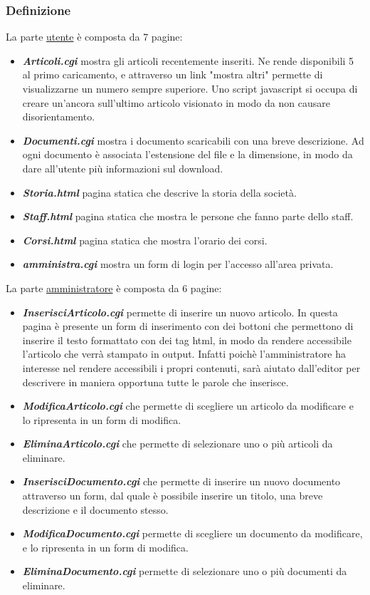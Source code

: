 \subsubsection{Definizione}
	\noindent La parte \underline{utente} \`e composta da 7 pagine:
\begin{itemize}
	\item {\bfseries\textit{Articoli.cgi}} mostra gli articoli recentemente inseriti. Ne rende disponibili 5 al primo caricamento, e attraverso un link "mostra altri" permette di visualizzarne un numero sempre superiore. Uno script javascript si occupa di creare un'ancora sull'ultimo articolo visionato in modo da non causare disorientamento.
	\item {\bfseries\textit{Documenti.cgi}} mostra i documento scaricabili con una breve descrizione. Ad ogni documento \`e associata l'estensione del file e la dimensione, in modo da dare all'utente pi\`u informazioni sul download.
	\item {\bfseries\textit{Storia.html}} pagina statica che descrive la storia della societ\`a.
	\item {\bfseries\textit{Staff.html}} pagina statica che mostra le persone che fanno parte dello staff.
	\item {\bfseries\textit{Corsi.html}} pagina statica che mostra l'orario dei corsi.
	\item {\bfseries\textit{amministra.cgi}} mostra un form di login per l'accesso all'area privata.
\end{itemize}

La parte \underline{amministratore} \`e composta da 6 pagine:
\begin{itemize}
	\item {\bfseries\textit{InserisciArticolo.cgi}} permette di inserire un nuovo articolo. In questa pagina \`e presente un form di inserimento con dei bottoni che permettono di inserire il testo formattato con dei tag html, in modo da rendere accessibile l'articolo che verr\`a stampato in output. Infatti poich\`e l'amministratore ha interesse nel rendere accessibili i propri contenuti, sar\`a aiutato dall'editor per descrivere in maniera opportuna tutte le parole che inserisce.
	\item {\bfseries\textit{ModificaArticolo.cgi}} che permette di scegliere un articolo da modificare e lo ripresenta in un form di modifica.
	\item {\bfseries\textit{EliminaArticolo.cgi}} che permette di selezionare uno o pi\`u articoli da eliminare.
	\item {\bfseries\textit{InserisciDocumento.cgi}} che permette di inserire un nuovo documento attraverso un form, dal quale \`e possibile inserire un titolo, una breve descrizione e il documento stesso.
	\item {\bfseries\textit{ModificaDocumento.cgi}} permette di scegliere un documento da modificare, e lo ripresenta in un form di modifica.
	\item {\bfseries\textit{EliminaDocumento.cgi}}  permette di selezionare uno o pi\`u documenti da eliminare.
\end{itemize}

